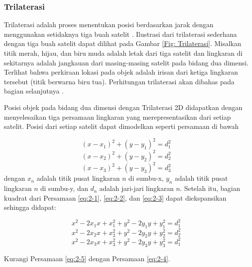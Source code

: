 \subsubsection{Trilaterasi}
Trilaterasi adalah proses menentukan posisi berdasarkan jarak dengan menggunakan setidaknya tiga buah satelit \cite{AmericanSocietyofCivilEngineers1994}. Ilustrasi dari trilaterasi sederhana dengan tiga buah satelit dapat dilihat pada Gambar \ref{Fig: Trilaterasi}. Misalkan titik merah, hijau, dan biru muda adalah letak dari tiga satelit dan lingkaran di sekitarnya adalah jangkauan dari masing-masing satelit pada bidang dua dimensi. Terlihat bahwa perkiraan lokasi pada objek adalah irisan dari ketiga lingkaran tersebut (titik berwarna biru tua). Perhitungan trilaterasi akan dibahas pada bagian selanjutnya \cite{Seo2012}.

Posisi objek pada bidang dua dimensi dengan Trilaterasi 2D didapatkan dengan menyelesaikan tiga persamaan lingkaran yang merepresentasikan dari setiap satelit. Posisi dari setiap satelit dapat dimodelkan seperti persamaan di bawah

\begin{equation}
	\left(x-x_1\right)^2 + \left(y-y_1\right)^2=d_1^2
	\label{eq:2-1}
\end{equation}
\begin{equation}
	\left(x-x_2\right)^2 + \left(y-y_2\right)^2=d_2^2
	\label{eq:2-2}
\end{equation}
\begin{equation}
	\left(x-x_3\right)^2 + \left(y-y_3\right)^2=d_3^2
	\label{eq:2-3}
\end{equation}
dengan $x_n$ adalah titik pusat lingkaran $n$ di sumbu-x, $y_n$ adalah titik pusat lingkaran $n$ di sumbu-y, dan $d_n$ adalah jari-jari lingkaran $n$. Setelah itu, bagian kuadrat dari Persamaan \ref{eq:2-1}, \ref{eq:2-2}, dan \ref{eq:2-3} dapat diekspansikan sehingga didapat:

\begin{equation}
	x^2-2x_1x+x_1^2+y^2-2y_1y+y_1^2=d_1^2
	\label{eq:2-4}
\end{equation}
\begin{equation}
	x^2-2x_2x+x_2^2+y^2-2y_2y+y_2^2=d_2^2
	\label{eq:2-5}
\end{equation}
\begin{equation}
	x^2-2x_3x+x_3^2+y^2-2y_3y+y_3^2=d_1^2
	\label{eq:2-6}
\end{equation}

Kurangi Persamaan \ref{eq:2-5} dengan  Persamaan \ref{eq:2-4}.

